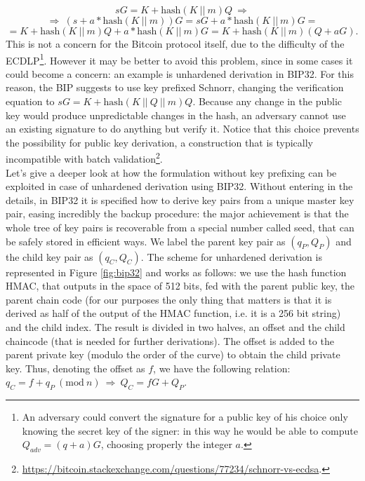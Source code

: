 $$sG = K + \text{hash}(K \ || \ m)Q \ \Longrightarrow$$
$$\Longrightarrow \ (s + a*\text{hash}(K \ || \ m))G = sG + a*\text{hash}(K \ || \ m)G =$$
$$= K + \text{hash}(K \ || \ m)Q + a*\text{hash}(K \ || \ m)G = K + \text{hash}(K \ || \ m)(Q + aG).$$
This is not a concern for the Bitcoin protocol itself, due to the difficulty of the ECDLP\footnote{An adversary could convert the signature for a public key of his choice only knowing the secret key of the signer: in this way he would be able to compute $Q_{adv} = (q + a)G$, choosing properly the integer $a$.}. However it may be better to avoid this problem, since in some cases it could become a concern: an example is unhardened derivation in BIP32. For this reason, the BIP suggests to use key prefixed Schnorr, changing the verification equation to $sG = K + \text{hash}(K \ || \ Q \ || \ m)Q$. Because any change in the public key would produce unpredictable changes in the hash, an adversary cannot use an existing signature to do anything but verify it. Notice that this choice prevents the possibility for public key derivation, a construction that is typically incompatible with batch validation\footnote{\url{https://bitcoin.stackexchange.com/questions/77234/schnorr-vs-ecdsa}.}.
\\
Let's give a deeper look at how the formulation without key prefixing can be exploited in case of unhardened derivation using BIP32. Without entering in the details, in BIP32 it is specified how to derive key pairs from a unique master key pair, easing incredibly the backup procedure: the major achievement is that the whole tree of key pairs is recoverable from a special number called seed, that can be safely stored in efficient ways. We label the parent key pair as $(q_P, Q_P)$ and the child key pair as $(q_C, Q_C)$. The scheme for unhardened derivation is represented in Figure \ref{fig:bip32} and works as follows: we use the hash function HMAC, that outputs in the space of 512 bits, fed with the parent public key, the parent chain code (for our purposes the only thing that matters is that it is derived as half of the output of the HMAC function, i.e. it is a 256 bit string) and the child index. The result is divided in two halves, an offset and the child chaincode (that is needed for further derivations). The offset is added to the parent private key (modulo the order of the curve) to obtain the child private key. Thus, denoting the offset as $f$, we have the following relation: $q_C = f + q_P \ (\text{mod} \ n) \ \Longrightarrow \ Q_C = fG + Q_P$.

